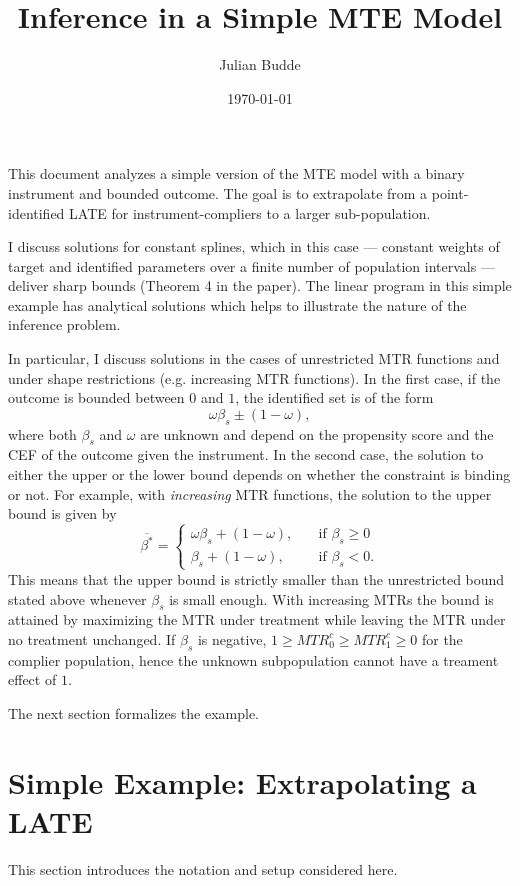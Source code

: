 \documentclass[11pt,a4paper,english]{article} %
\title{Inference in a Simple MTE Model}
\author{Julian Budde}
\date{\today}
\numberwithin{equation}{section}
\numberwithin{figure}{section}
\numberwithin{table}{section}
\theoremstyle{definition}
\theoremstyle{remark}
\begin{document}
\maketitle
This document analyzes a simple version of the MTE model with a binary instrument and bounded outcome.
The goal is to extrapolate from a point-identified LATE for instrument-compliers to a larger sub-population.

I discuss solutions for constant splines, which in this case --- constant weights of target and identified parameters over a finite number of population intervals --- deliver sharp bounds (Theorem 4 in the paper).
The linear program in this simple example has analytical solutions which helps to illustrate the nature of the inference problem.

In particular, I discuss solutions in the cases of unrestricted MTR functions and under shape restrictions (e.g. increasing MTR functions).
In the first case, if the outcome is bounded between $0$ and $1$, the identified set is of the form
\begin{equation}
	\omega \beta_s \pm (1 - \omega),
\end{equation}
where both $\beta_s$ and $\omega$ are unknown and depend on the propensity score and the CEF of the outcome given the instrument.
In the second case, the solution to either the upper or the lower bound depends on whether the constraint is binding or not.
For example, with \textit{increasing} MTR functions, the solution to the upper bound is given by
\begin{equation}
	\overline{\beta^*}=
	\begin{cases}
		\omega \beta_s + (1 - \omega),& \quad \text{if } \beta_s \geq 0\\
		\beta_s + (1 - \omega),              & \quad \text{if } \beta_s < 0.
	\end{cases}
\end{equation}
This means that the upper bound is strictly smaller than the unrestricted bound stated above whenever $\beta_s$ is small enough.
With increasing MTRs the bound is attained by maximizing the MTR under treatment while leaving the MTR under no treatment unchanged.
If $\beta_s$ is negative, $1 \geq MTR^c_0 \geq MTR^c_1 \geq 0$ for the complier population, hence the unknown subpopulation cannot have a treament effect of $1$.

The next section formalizes the example.

\section{Simple Example: Extrapolating a LATE}
This section introduces the notation and setup considered here.
\end{document}
